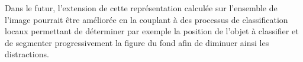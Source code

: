 \documentclass[11pt,french,a4paper,oneside]{article}%
\begin{document}
%
%
%
%
%
Dans le futur, l'extension de cette représentation calculée sur l'ensemble de l'image pourrait être améliorée en la couplant à des processus de classification locaux permettant de déterminer par exemple la position de l'objet à classifier et de segmenter progressivement la figure du fond afin de diminuer ainsi les distractions.
\end{document}
